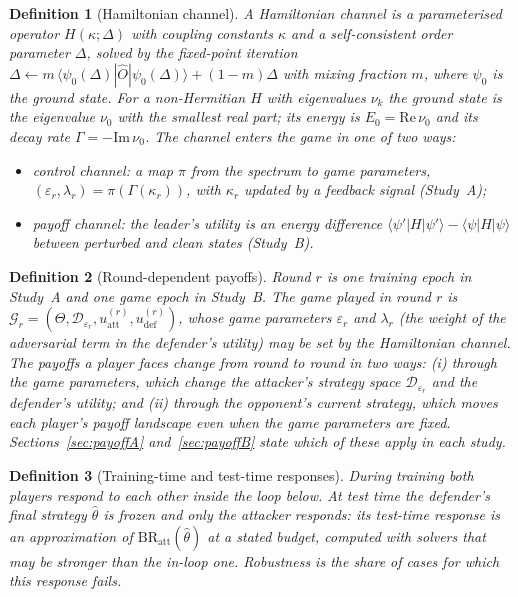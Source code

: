 \documentclass[conference]{IEEEtran}
\newtheorem{definition}{Definition}
\newcommand{\BR}{\mathrm{BR}}
\begin{document}
\begin{definition}[Hamiltonian channel]\label{def:hc}
A Hamiltonian channel is a parameterised operator $H(\kappa;\Delta)$ with coupling constants $\kappa$ and a self-consistent order parameter $\Delta$, solved by the fixed-point iteration $\Delta\leftarrow m\,\langle\psi_0(\Delta)|\hat O|\psi_0(\Delta)\rangle+(1-m)\Delta$ with mixing fraction $m$, where $\psi_0$ is the ground state. For a non-Hermitian $H$ with eigenvalues $\nu_k$ the ground state is the eigenvalue $\nu_0$ with the smallest real part; its energy is $E_0=\mathrm{Re}\,\nu_0$ and its decay rate $\Gamma=-\mathrm{Im}\,\nu_0$. The channel enters the game in one of two ways:
\begin{itemize}
\item \emph{control channel}: a map $\pi$ from the spectrum to game parameters, $(\varepsilon_r,\lambda_r)=\pi(\Gamma(\kappa_r))$, with $\kappa_r$ updated by a feedback signal (Study~A);
\item \emph{payoff channel}: the leader's utility is an energy difference $\langle\psi'|H|\psi'\rangle-\langle\psi|H|\psi\rangle$ between perturbed and clean states (Study~B).
\end{itemize}
\end{definition}

\begin{definition}[Round-dependent payoffs]\label{def:payoffdyn}
Round $r$ is one training epoch in Study~A and one game epoch in Study~B. The game played in round $r$ is $\mathcal G_r=(\Theta,\mathcal D_{\varepsilon_r},u^{(r)}_{\mathrm{att}},u^{(r)}_{\mathrm{def}})$, whose game parameters $\varepsilon_r$ and $\lambda_r$ (the weight of the adversarial term in the defender's utility) may be set by the Hamiltonian channel. The payoffs a player faces change from round to round in two ways: (i) through the game parameters, which change the attacker's strategy space $\mathcal D_{\varepsilon_r}$ and the defender's utility; and (ii) through the opponent's current strategy, which moves each player's payoff landscape even when the game parameters are fixed. Sections~\ref{sec:payoffA} and~\ref{sec:payoffB} state which of these apply in each study.
\end{definition}

\begin{definition}[Training-time and test-time responses]\label{def:testresp}
During training both players respond to each other inside the loop below. At test time the defender's final strategy $\hat\theta$ is frozen and only the attacker responds: its test-time response is an approximation of $\BR_{\mathrm{att}}(\hat\theta)$ at a stated budget, computed with solvers that may be stronger than the in-loop one. Robustness is the share of cases for which this response fails.
\end{definition}
\end{document}
